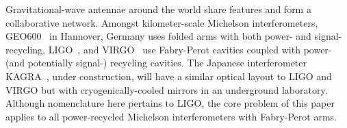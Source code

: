 
Gravitational-wave antennae around the world share features and form a collaborative network. Amongst kilometer-scale Michelson interferometers, GEO600~\cite{Willke2002} in Hannover, Germany uses folded arms with both power- and signal-recycling, LIGO~\cite{LIGOFirst2004}, and VIRGO~\cite{Acernese2005} use Fabry-Perot cavities coupled with power- (and potentially signal-) recycling cavities. The Japanese interferometer KAGRA~\cite{Kuroda2010}, under construction, will have a similar optical layout to LIGO and VIRGO but with cryogenically-cooled mirrors in an underground laboratory. Although nomenclature here pertains to LIGO, the core problem of this paper applies to all power-recycled Michelson interferometers with Fabry-Perot arms.


